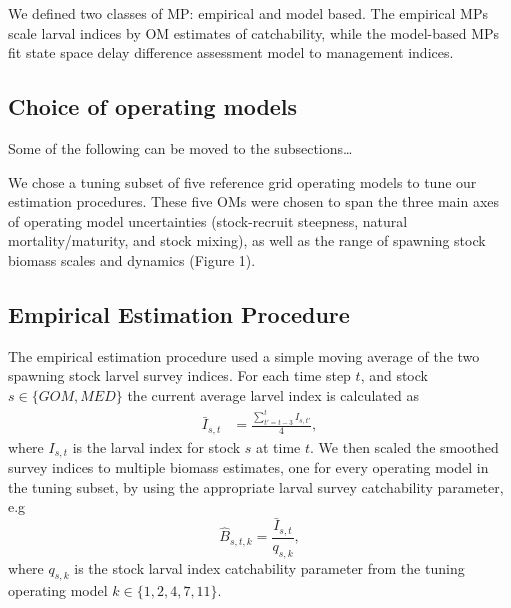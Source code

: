 \documentclass[]{article}
\begin{document}
We defined two classes of MP: empirical and model based. The empirical MPs
scale larval indices by OM estimates of catchability, while the
model-based MPs fit state space delay difference assessment model
to management indices.

\hypertarget{choice-of-operating-models}{%
\subsection{Choice of operating models}\label{choice-of-operating-models}}

Some of the following can be moved to the subsections\ldots{}

We chose a tuning subset of five reference grid operating models to tune our
estimation procedures. These five OMs were chosen to span the three main axes
of operating model uncertainties (stock-recruit steepness, natural
mortality/maturity, and stock mixing), as well as the range of spawning
stock biomass scales and dynamics (Figure 1).

\hypertarget{empirical-estimation-procedure}{%
\subsection{Empirical Estimation Procedure}\label{empirical-estimation-procedure}}

The empirical estimation procedure used a simple moving average of
the two spawning stock larvel survey indices. For each time step \(t\),
and stock \(s \in \{GOM, MED\}\) the current average larvel index is
calculated as
\begin{align}
\bar{I}_{s,t} & = \frac{\sum_{t'= t-3}^{t} I_{s,t'}}{4}, 
\end{align}
where \(I_{s,t}\) is the larval index for stock \(s\) at time \(t\). We then
scaled the smoothed survey indices to multiple biomass estimates, one
for every operating model in the tuning subset, by using the appropriate
larval survey catchability parameter, e.g
\begin{equation}
\hat{B}_{s,t,k} = \frac{\bar{I}_{s,t}}{q_{s,k}},
\end{equation}
where \(q_{s,k}\) is the stock larval index catchability parameter from
the tuning operating model \(k \in \{1,2,4,7,11\}\).
\end{document}
